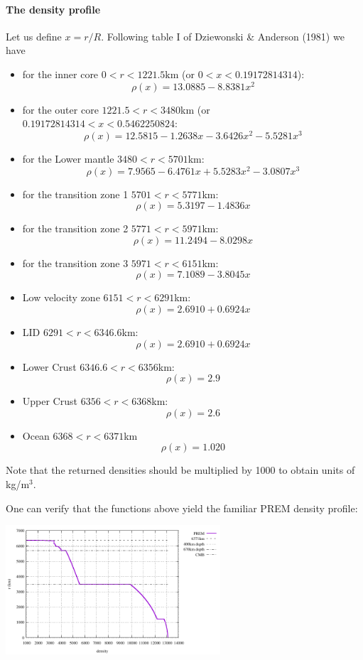 
\paragraph{The density profile} Let us define $x=r/R$.
Following table I of Dziewonski \& Anderson (1981) \cite{dzan81} 
we have 

\begin{itemize}
\item for the inner core $0<r<1221.5\si{\km}$ (or $ 0<x<0.19172814314$):
\[
\rho(x) =13.0885-8.8381 x^2
\]
\item for the outer core $1221.5<r<3480$km (or  $ 0.19172814314  <x< 0.5462250824$:
\[
\rho(x)=12.5815-1.2638x-3.6426x^2-5.5281x^3
\]
\item for the Lower mantle $3480<r<5701$km:
\[
\rho(x)=7.9565-6.4761x+5.5283x^2-3.0807x^3
\]
\item for the transition zone 1 $5701<r<5771$km:
\[
\rho(x)=5.3197-1.4836x
\]
\item for the transition zone 2 $5771<r<5971$km:
\[
\rho(x)=11.2494-8.0298x
\]
\item for the transition zone 3 $5971<r<6151$km:
\[
\rho(x)=7.1089-3.8045x
\]
\item Low velocity zone $6151<r<6291$km:
\[
\rho(x)=2.6910+0.6924x
\]
\item LID  $6291<r<6346.6$km:
\[
\rho(x)=2.6910+0.6924x
\]
\item Lower Crust $6346.6<r<6356$km:
\[
\rho(x)=2.9
\]
\item Upper Crust $6356<r<6368$km:
\[
\rho(x)=2.6
\]
\item Ocean $6368<r<6371$km
\[
\rho(x)=1.020
\]
\end{itemize}

\noindent Note that the returned densities should be multiplied by 1000 to obtain 
units of kg/m$^3$.

One can verify that the functions above yield the familiar PREM density profile:
\begin{center}
\includegraphics[width=8cm]{images/prem/rho.pdf}
\end{center}

